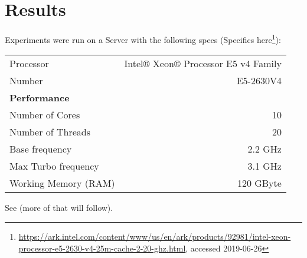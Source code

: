 \chapter{Results}\label{chap:results}



Experiments were run on a Server with the following specs (Specifics
here\footnote{\url{https://ark.intel.com/content/www/us/en/ark/products/92981/intel-xeon-processor-e5-2630-v4-25m-cache-2-20-ghz.html},
accessed 2019-06-26}):


\begin{table}[ht]
\begin{tabular}{@{}lr@{}}
    Processor & Intel® Xeon® Processor E5 v4 Family \\
    Number & E5-2630V4 \\ \midrule
    \textbf{Performance} & \\ \midrule
    Number of Cores & 10 \\
    Number of Threads & 20 \\
    Base frequency & 2.2 GHz \\
    Max Turbo frequency & 3.1 GHz \\
    Working Memory (RAM) & 120 GByte \\
\end{tabular}
\end{table}






See  (more of that will follow).






